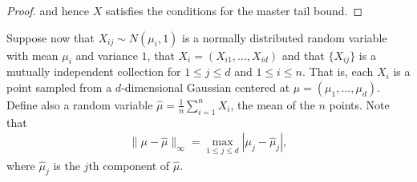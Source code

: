 \begin{homework}[e]
\begin{prf}
\begin{proof}
      and hence $X$ satisfies the conditions for the master tail bound.
    \end{proof}
    Suppose now that $X_{ij} \sim N(\mu_i,1)$ is a normally distributed random variable with mean $\mu_i$ and variance $1$, that $X_i = (X_{i1},...,X_{id})$ and that $\{X_{ij}\}$ is a mutually independent collection for $1\leq j\leq d$ and $1\leq i \leq n$. That is, each $X_i$ is a point sampled from a $d$-dimensional Gaussian centered at $\mu = (\mu_1,...,\mu_d)$. Define also a random variable $\hat\mu = \frac{1}{n}\sum_{i=1}^n X_i$, the mean of the $n$ points. Note that
    \begin{align*}
      \|\mu - \hat\mu\|_{\infty} = \max_{1\leq j\leq d} |\mu_j - \hat\mu_j|,
    \end{align*}
    where $\hat\mu_j$ is the $j$th component of $\hat\mu$. 


\end{prf}
\end{homework}

